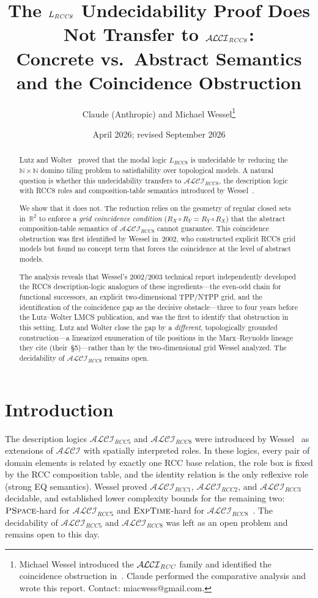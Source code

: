 \documentclass[11pt]{article}
\title{\bfseries The $\LRCC{8}$ Undecidability Proof Does Not Transfer to $\ALCIRCC{8}$:\\
  Concrete vs.\ Abstract Semantics and the Coincidence Obstruction}
\author{Claude (Anthropic) and Michael Wessel\thanks{%
  Michael Wessel introduced the $\ALCIRCC{}$ family and identified the
  coincidence obstruction in~\cite{Wessel2003,Wessel2001}.
  Claude performed the comparative analysis and wrote this report.
  Contact: miacwess@gmail.com.}}
\date{April 2026; revised September 2026}
\newcommand{\ALCIRCC}[1]{\ensuremath{\mathcal{ALCI}_{\mathit{RCC#1}}}}
\newcommand{\LRCC}[1]{\ensuremath{L_{\mathit{RCC#1}}}}
\newcommand{\ALCI}{\ensuremath{\mathcal{ALCI}}}
\newcommand{\reals}{\mathbb{R}}
\newcommand{\naturals}{\mathbb{N}}
\newcommand{\EXPTIME}{\textsc{ExpTime}}
\newcommand{\PSPACE}{\textsc{PSpace}}
\begin{document}
\maketitle

\begin{abstract}
Lutz and Wolter~\cite{LutzWolter2006} proved that the modal logic $\LRCC{8}$
is undecidable by reducing the $\naturals\times\naturals$ domino tiling problem
to satisfiability over topological models.  A natural question is whether this
undecidability transfers to $\ALCIRCC{8}$, the description logic with RCC8 roles
and composition-table semantics introduced by Wessel~\cite{Wessel2003}.

We show that it does not.  The reduction relies on the geometry of regular closed
sets in~$\reals^2$ to enforce a \emph{grid coincidence condition}
($R_X \circ R_Y = R_Y \circ R_X$) that the abstract composition-table semantics
of $\ALCIRCC{8}$ cannot guarantee.  This coincidence obstruction was first
identified by Wessel in~2002, who constructed explicit RCC8 grid models but
found no concept term that forces the coincidence at the level of abstract
models.

The analysis reveals that Wessel's 2002/2003 technical report independently
developed the RCC8 description-logic analogues of these ingredients---the
even-odd chain for functional successors, an explicit two-dimensional
TPP/NTPP grid, and the identification of the coincidence gap as the decisive
obstacle---three to four years before the Lutz--Wolter LMCS publication, and
was the first to identify that obstruction in this setting.  Lutz and Wolter
close the gap by a \emph{different}, topologically grounded construction---a
linearized enumeration of tile positions in the Marx--Reynolds lineage they
cite (their~\S5)---rather than by the two-dimensional grid Wessel analyzed.
The decidability of $\ALCIRCC{8}$ remains open.
\end{abstract}

\section{Introduction}

The description logics $\ALCIRCC{5}$ and $\ALCIRCC{8}$ were introduced by
Wessel~\cite{Wessel2001,Wessel2003} as extensions of $\ALCI$ with spatially
interpreted roles.  In these logics, every pair of domain elements is related
by exactly one RCC base relation, the role box is fixed by the RCC composition
table, and the identity relation is the only reflexive role (strong EQ
semantics).  Wessel proved $\ALCIRCC{1}$, $\ALCIRCC{2}$, and $\ALCIRCC{3}$
decidable, and established lower complexity bounds for the remaining two:
$\PSPACE$-hard for $\ALCIRCC{5}$ and $\EXPTIME$-hard for
$\ALCIRCC{8}$~\cite{Wessel2003}.  The decidability of $\ALCIRCC{5}$ and
$\ALCIRCC{8}$ was left as an open problem and remains open to this day.
\end{document}
